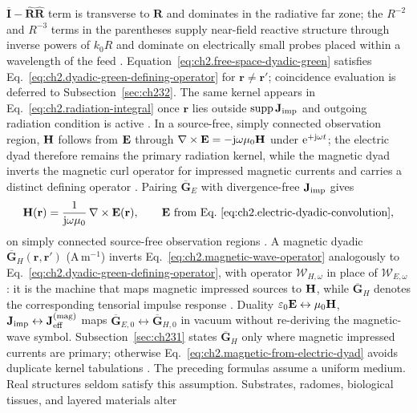 \(\overline{\mathbf{I}}-\widehat{\mathbf{R}}\widehat{\mathbf{R}}\) term is transverse
to \(\mathbf{R}\) and dominates in the radiative far zone; the $R^{-2}$ and $R^{-3}$ terms
in the parentheses supply near-field reactive structure through inverse powers of \(k_0 R\)
and dominate on electrically small probes placed within a wavelength of the feed
\cite{stratton1941}. Equation~\eqref{eq:ch2.free-space-dyadic-green} satisfies
Eq.~\eqref{eq:ch2.dyadic-green-defining-operator} for
\(\mathbf{r}\neq\mathbf{r}'\); coincidence evaluation is deferred to
Subsection~\ref{sec:ch232}. The same kernel appears in
Eq.~\eqref{eq:ch2.radiation-integral} once \(\mathbf{r}\) lies outside
\(\operatorname{supp}\mathbf{J}_{\mathrm{imp}}\) and outgoing radiation condition is active
\cite{harrington2001}. In a source-free, simply connected observation region, $\mathbf{H}$ follows from $\mathbf{E}$ through
$\nabla\times\mathbf{E}=-\mathrm{j}\omega\mu_0\mathbf{H}$ under $\mathrm{e}^{+\mathrm{j}\omega t}$; the electric dyad therefore remains the primary radiation kernel, while the
magnetic dyad inverts the magnetic curl operator for impressed magnetic currents and carries a distinct defining operator
\cite{tai1994,stratton1941}. Pairing $\overline{\mathbf{G}}_{E}$ with divergence-free $\mathbf{J}_{\mathrm{imp}}$ gives
\begin{equation}
\label{eq:ch2.magnetic-from-electric-dyad}
\mathbf{H}(\mathbf{r})
=
\frac{1}{\mathrm{j}\omega\mu_0}\,\nabla\times\mathbf{E}(\mathbf{r}),
\qquad
\mathbf{E}\ \text{from Eq.~\eqref{eq:ch2.electric-dyadic-convolution}},
\end{equation}
on simply connected source-free observation regions \cite{stratton1941}. A magnetic
dyadic \(\overline{\mathbf{G}}_{H}(\mathbf{r},\mathbf{r}')\) (A\,m\(^{-1}\)) inverts
Eq.~\eqref{eq:ch2.magnetic-wave-operator} analogously to
Eq.~\eqref{eq:ch2.dyadic-green-defining-operator}, with operator
$\mathcal{W}_{H,\omega}$ in place of $\mathcal{W}_{E,\omega}$: it is the machine that
maps magnetic impressed sources to $\mathbf{H}$, while $\overline{\mathbf{G}}_{H}$ denotes the
corresponding tensorial impulse response \cite{harrington2001}. Duality
\(\varepsilon_0\mathbf{E}\leftrightarrow\mu_0\mathbf{H}\), \(\mathbf{J}_{\mathrm{imp}}\leftrightarrow\mathbf{J}^{\mathrm{(mag)}}_{\mathrm{eff}}\)
maps \(\overline{\mathbf{G}}_{E,0}\leftrightarrow\overline{\mathbf{G}}_{H,0}\) in
vacuum without re-deriving the magnetic-wave symbol. Subsection~\ref{sec:ch231} states
\(\overline{\mathbf{G}}_{H}\) only where magnetic impressed currents are primary;
otherwise Eq.~\eqref{eq:ch2.magnetic-from-electric-dyad} avoids duplicate kernel
tabulations \cite{stratton1941}.
The preceding formulas assume a uniform medium. Real structures seldom satisfy this
assumption. Substrates, radomes, biological tissues, and layered materials alter
